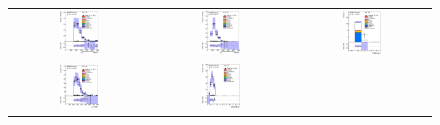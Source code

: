 \clearpage
\begin{figure}[htbp]
\begin{center}
\begin{tabular}{ccc}
%
\includegraphics[width=0.30\textwidth]{appendices/figures/sdrs/JetPtB1_ELEMUONCR4_1W_NOMINAL.eps}  &
\includegraphics[width=0.30\textwidth]{appendices/figures/sdrs/JetPtB2_ELEMUONCR4_1W_NOMINAL.eps} &
\includegraphics[width=0.30\textwidth]{appendices/figures/sdrs/nWhad_ELEMUONCR4_1W_NOMINAL_logscale.eps} \\
\includegraphics[width=0.30\textwidth]{appendices/figures/sdrs/VLQAna_WbX_W1Pt_ELEMUONCR4_1W_NOMINAL.eps} &
\includegraphics[width=0.30\textwidth]{appendices/figures/sdrs/VLQAna_WbX_DRLepMet_ELEMUONCR4_1W_NOMINAL.eps} &

\end{tabular}
\end{center}
\end{figure}
